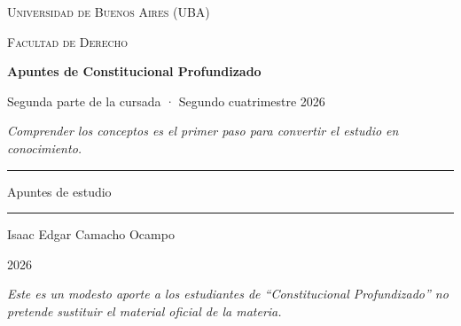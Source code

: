 \documentclass[12pt,oneside]{book}
\newcommand{\universidad}{Universidad de Buenos Aires (UBA)}
\newcommand{\facultad}{Facultad de Derecho}
\newcommand{\titulo}{Apuntes de Constitucional Profundizado}
\newcommand{\autor}{Isaac Edgar Camacho Ocampo}
\newcommand{\anio}{2026}
\begin{document}
\begin{titlepage}

\thispagestyle{empty}

\begin{center}

\vspace*{1cm}

{\large \textsc{\universidad}}

\vspace{0.2cm}

{\large \textsc{\facultad}}

\vspace{3cm}

{\Huge \textbf{\titulo}}

\vspace{0.6cm}

{\large Segunda parte de la cursada · Segundo cuatrimestre 2026}

\vspace{0.8cm}

\textit{Comprender los conceptos es el primer paso para convertir el estudio en conocimiento.}

\vspace{1.2cm}

\rule{0.70\textwidth}{0.5pt}

\vspace{0.5cm}

{\large Apuntes de estudio}

\vspace{0.5cm}

\rule{0.70\textwidth}{0.5pt}

\vfill

{\large \autor}

\vspace{0.3cm}

{\large \anio}

\end{center}

\vfill

\begin{flushleft}
\textit{Este es un modesto aporte a los estudiantes de ``Constitucional Profundizado'' no pretende sustituir el material oficial de la materia.}
\end{flushleft}

\end{titlepage}
\end{document}
